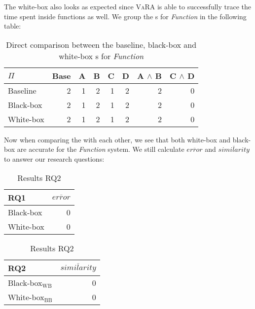 The white-box {\perfInfluenceModel} also looks as expected since \textsc{VaRA} is able to successfully trace the time 
spent inside functions as well. We group the {\perfInfluenceModel}s for \emph{Function} in the following table:

\begin{table}[H]
    \centering
    \begin{tabular}{lrrrrrrr}
    \toprule
    $\Pi$    & Base & A & B & C & D & A $\land$ B & C $\land$ D  \\ \midrule
    Baseline & 2    & 1 & 2 & 1 & 2 & 2           & 0            \\
    Black-box & 2   & 1 & 2 & 1 & 2 & 2           & 0            \\
    White-box & 2   & 1 & 2 & 1 & 2 & 2           & 0            \\ \bottomrule
    \end{tabular}  
    \caption{Direct comparison between the baseline, black-box and white-box {\perfInfluenceModel}s for \emph{Function}}\label{aggr:results-function}
\end{table}

Now when comparing the {\perfInfluenceModel} with each other, we see that both white-box and black-box are accurate for the \emph{Function}
system. We still calculate $\overline{error}$ and $\overline{similarity}$ to answer our research questions:

\begin{table}[H]
    \begin{minipage}{.5\linewidth}
        \centering
        \begin{tabular}{lr}
        \toprule
        RQ1     & $\overline{error}$         \\ \midrule
        Black-box & 0              \\
        White-box & 0              \\ \bottomrule
        \end{tabular}  
        \caption{Results RQ1}
    \end{minipage}%
    \begin{minipage}{.5\linewidth}
        \centering
        \begin{tabular}{lr}
            \toprule
            RQ2     & $\overline{similarity}$   \\ \midrule
            Black-box$_\text{WB}$ & 0              \\
            White-box$_\text{BB}$ & 0              \\ \bottomrule
            \end{tabular}  
            \caption{Results RQ2}
    \end{minipage} 
    \end{table}

